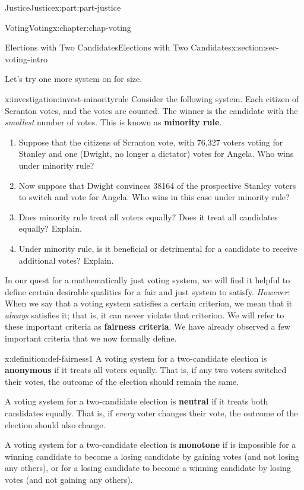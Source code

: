 \documentclass[oneside,10pt,]{book}
\newcommand{\terminology}[1]{\textbf{#1}}
\numberwithin{equation}{section}
\begin{document}
\begin{partptx}{Justice}{}{Justice}{}{}{x:part:part-justice}
\begin{chapterptx}{Voting}{}{Voting}{}{}{x:chapter:chap-voting}
\begin{sectionptx}{Elections with Two Candidates}{}{Elections with Two Candidates}{}{}{x:section:sec-voting-intro}
\par
Let's try one more system on for size.%
\begin{investigation}{}{x:investigation:invest-minorityrule}%
Consider the following system. Each citizen of Scranton votes, and the votes are counted. The winner is the candidate with the \emph{smallest} number of votes. This is known as \terminology{minority rule}.%
%
\begin{enumerate}
\item{}Suppose that the citizens of Scranton vote, with 76,327 voters voting for Stanley and one (Dwight, no longer a dictator) votes for Angela. Who wins under minority rule?%
\item{}Now suppose that Dwight convinces 38164 of the prospective Stanley voters to switch and vote for Angela. Who wins in this case under minority rule?%
\item{}Does minority rule treat all voters equally? Does it treat all candidates equally? Explain.%
\item{}Under minority rule, is it beneficial or detrimental for a candidate to receive additional votes? Explain.%
\end{enumerate}
\end{investigation}%
 In our quest for a mathematically just voting system, we will find it helpful to define certain desirable qualities for a fair and just system to satisfy. \emph{However}: When we say that a voting system satisfies a certain criterion, we mean that it \emph{always} satisfies it; that is, it can never violate that criterion. We will refer to these important criteria as \terminology{fairness criteria}. We have already observed a few important criteria that we now formally define.%
\begin{definition}{}{x:definition:def-fairness1}%
%
%
%
A voting system for a two-candidate election is \terminology{anonymous} if it treats all voters equally. That is, if any two voters switched their votes, the outcome of the election should remain the same.%
\par
A voting system for a two-candidate election is \terminology{neutral} if it treats both candidates equally. That is, if \emph{every} voter changes their vote, the outcome of the election should also change.%
\par
A voting system for a two-candidate election is \terminology{monotone} if is impossible for a winning candidate to become a losing candidate by gaining votes (and not losing any others), or for a losing candidate to become a winning candidate by losing votes (and not gaining any others).%

\end{definition}
\end{sectionptx}
\end{chapterptx}
\end{partptx}
\end{document}
